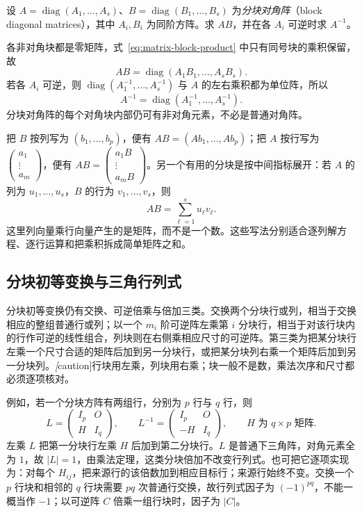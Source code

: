 \begin{example}
\label{ex:matrix-block-diagonal}
设 $A=\operatorname{diag}(A_1,\ldots,A_s)$、$B=\operatorname{diag}(B_1,\ldots,B_s)$ 为\emph{分块对角阵}（block diagonal matrices），其中 $A_i,B_i$ 为同阶方阵。求 $AB$，并在各 $A_i$ 可逆时求 $A^{-1}$。
\end{example}

\begin{solve}
各非对角块都是零矩阵，式~\eqref{eq:matrix-block-product} 中只有同号块的乘积保留，故
\[
    AB=\operatorname{diag}(A_1B_1,\ldots,A_sB_s).
\]
若各 $A_i$ 可逆，则 $\operatorname{diag}(A_1^{-1},\ldots,A_s^{-1})$ 与 $A$ 的左右乘积都为单位阵，所以
\[
    A^{-1}=\operatorname{diag}(A_1^{-1},\ldots,A_s^{-1}).
\]
分块对角阵的每个对角块内部仍可有非对角元素，不必是普通对角阵。
\end{solve}

把 $B$ 按列写为 $(b_1,\ldots,b_p)$，便有 $AB=(Ab_1,\ldots,Ab_p)$；把 $A$ 按行写为 $\begin{pmatrix}a_1\\\vdots\\a_m\end{pmatrix}$，便有 $AB=\begin{pmatrix}a_1B\\\vdots\\a_mB\end{pmatrix}$。另一个有用的分块是按中间指标展开：若 $A$ 的列为 $u_1,\ldots,u_s$，$B$ 的行为 $v_1,\ldots,v_s$，则
\begin{equation}
\label{eq:matrix-column-row-products}
    AB=\sum_{\ell=1}^{s}u_\ell v_\ell.
\end{equation}
这里列向量乘行向量产生的是矩阵，而不是一个数。这些写法分别适合逐列解方程、逐行运算和把乘积拆成简单矩阵之和。

\subsection{分块初等变换与三角行列式}

分块初等变换仍有交换、可逆倍乘与倍加三类。交换两个分块行或列，相当于交换相应的整组普通行或列；以一个 $m_i$ 阶可逆阵左乘第 $i$ 分块行，相当于对该行块内的行作可逆的线性组合，列块则在右侧乘相应尺寸的可逆阵。第三类为把某分块行左乘一个尺寸合适的矩阵后加到另一分块行，或把某分块列右乘一个矩阵后加到另一分块列。\emph[caution]{行块用左乘，列块用右乘；块一般不是数，乘法次序和尺寸都必须逐项核对。}

例如，若一个分块方阵有两组行，分别为 $p$ 行与 $q$ 行，则
\[
    L=\begin{pmatrix}I_p&O\\H&I_q\end{pmatrix},\qquad
    L^{-1}=\begin{pmatrix}I_p&O\\-H&I_q\end{pmatrix},\qquad H\text{ 为 }q\times p\text{ 矩阵}.
\]
左乘 $L$ 把第一分块行左乘 $H$ 后加到第二分块行。$L$ 是普通下三角阵，对角元素全为 $1$，故 $|L|=1$，由乘法定理，这类分块倍加不改变行列式。也可把它逐项实现为：对每个 $H_{ij}$，把来源行的该倍数加到相应目标行；来源行始终不变。交换一个 $p$ 行块和相邻的 $q$ 行块需要 $pq$ 次普通行交换，故行列式因子为 $(-1)^{pq}$，不能一概当作 $-1$；以可逆阵 $C$ 倍乘一组行块时，因子为 $|C|$。

